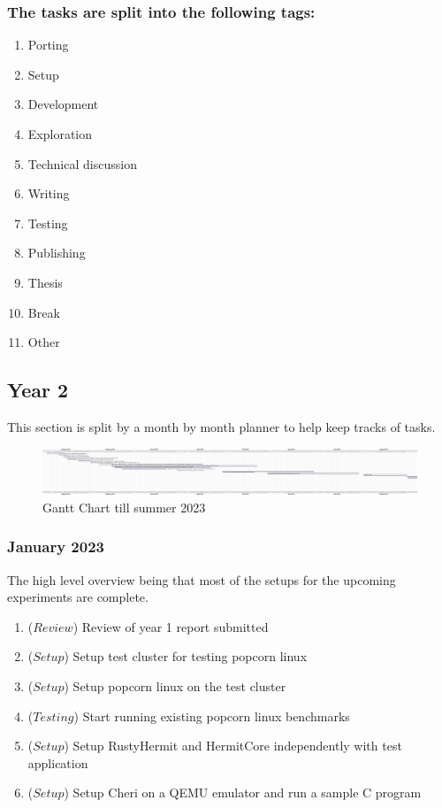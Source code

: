 \subsubsection{The tasks are split into the following tags:}
\begin{enumerate}
  \item Porting 
  \item Setup
  \item Development
  \item Exploration 
  \item Technical discussion 
  \item Writing
  \item Testing
  \item Publishing
  \item Thesis
  \item Break
  \item Other
\end{enumerate}


\subsection{Year 2}
This section is split by a month by month planner to help keep tracks of tasks. 
\begin{landscape}
\begin{figure}[htbp!] 
  \centering    
  \includegraphics[width=6\textwidth]{gnatt}
  \caption[Planner]{Gantt Chart till summer 2023}
  \label{fig:Gantt Chart}
  \end{figure}
\end{landscape}

\subsubsection{January 2023}
The high level overview being that most of the setups for the upcoming experiments
are complete. 
\begin{enumerate}
    \item (\(Review\)) Review of year 1 report submitted 
    \item (\(Setup\)) Setup test cluster for testing popcorn linux 
    \item (\(Setup\)) Setup popcorn linux on the test cluster
    \item (\(Testing\)) Start running existing popcorn linux benchmarks 
    \item (\(Setup\)) Setup RustyHermit and HermitCore independently with test application 
    \item (\(Setup\)) Setup Cheri on a QEMU emulator and run a sample C program 
  \end{enumerate} 


